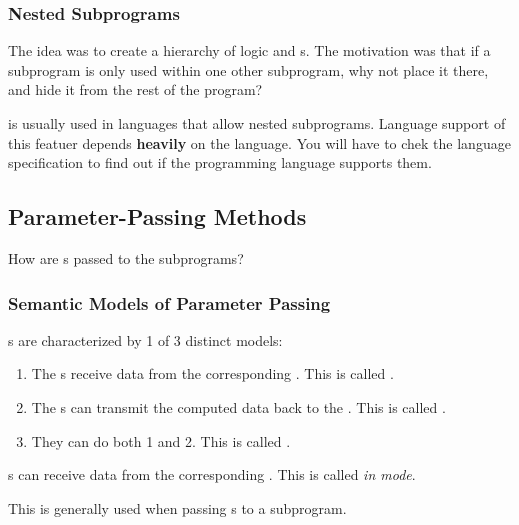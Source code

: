 \subsubsection{Nested Subprograms}\label{subsubsec:Nested_Subprograms}
The idea was to create a hierarchy of logic and s.
The motivation was that if a subprogram is only used within one other subprogram, why not place it there, and hide it from the rest of the program?

 is usually used in languages that allow nested subprograms.
Language support of this featuer depends \textbf{heavily} on the language.
You will have to chek the language specification to find out if the programming language supports them.

\subsection{Parameter-Passing Methods}\label{subsec:Parameter_Passing_Methods}
How are s passed to the subprograms?

\subsubsection{Semantic Models of Parameter Passing}\label{subsubsec:Semantic_Models_Parameter_Passing}
s are characterized by 1 of 3 distinct  models:
\begin{enumerate}[noitemsep]
\item The s receive data from the corresponding . This is called \textbf{}.
\item The s  can transmit the computed data back to the . This is called \textbf{}.
\item They can do both 1 and 2. This is called \textbf{}.
\end{enumerate}

\begin{definition}[In Mode]\label{def:Parameter_Passing-In_Mode}
  s can receive data from the corresponding .
  This is called \emph{in mode}.

  This is generally used when passing s to a subprogram.
\end{definition}

